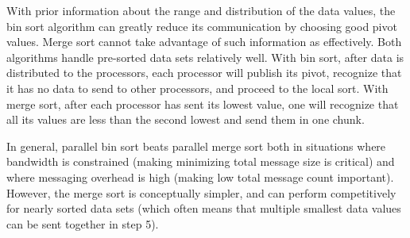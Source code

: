 \documentclass[10pt]{article}
\begin{document}
With prior information about the range and distribution of the data values, the bin sort algorithm can greatly reduce its communication by choosing good pivot values. Merge sort cannot take advantage of such information as effectively. Both algorithms handle pre-sorted data sets relatively well. With bin sort, after data is distributed to the processors, each processor will publish its pivot, recognize that it has no data to send to other processors, and proceed to the local sort. With merge sort, after each processor has sent its lowest value, one will recognize that all its values are less than the second lowest and send them in one chunk.

In general, parallel bin sort beats parallel merge sort both in situations where bandwidth is constrained (making minimizing total message size is critical) and where messaging overhead is high (making low total message count important). However, the merge sort is conceptually simpler, and can perform competitively for nearly sorted data sets (which often means that multiple smallest data values can be sent together in step 5).
\end{document}
